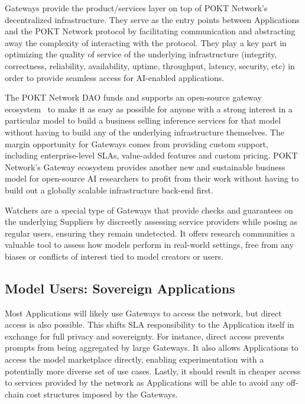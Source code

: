 \documentclass[conference,compsoc]{IEEEtran}
\begin{document}
Gateways provide the product/services layer on top of POKT Network’s decentralized infrastructure. They serve as the entry points between Applications and the POKT Network protocol by facilitating communication and abstracting away the complexity of interacting with the protocol. They play a key part in optimizing the quality of service of the underlying infrastructure (integrity, correctness, reliability, availability, uptime, throughput, latency, security, etc) in order to provide seamless access for AI-enabled applications.

The POKT Network DAO funds and supports an open-source gateway ecosystem~\cite{poktGatewayServer} to make it as easy as possible for anyone with a strong interest in a particular model to build a business selling inference services for that model without having to build any of the underlying infrastructure themselves. The margin opportunity for Gateways comes from providing custom support, including enterprise-level SLAs, value-added features and custom pricing. POKT Network’s Gateway ecosystem provides another new and sustainable business model for open-source AI researchers to profit from their work without having to build out a globally scalable infrastructure back-end first.

Watchers are a special type of Gateways that provide checks and guarantees on the underlying Suppliers by discreetly assessing service providers while posing as regular users, ensuring they remain undetected. It offers research communities a valuable tool to assess how models perform in real-world settings, free from any biases or conflicts of interest tied to model creators or users.


\subsection{Model Users: Sovereign Applications}

Most Applications will likely use Gateways to access the network, but direct access is also possible. This shifts SLA responsibility to the Application itself in exchange for full privacy and sovereignty. For instance, direct access prevents prompts from being aggregated by large Gateways. It also allows Applications to access the model marketplace directly, enabling experimentation with a potentially more diverse set of use cases. Lastly, it should result in cheaper access to services provided by the network as Applications will be able to avoid any off-chain cost structures imposed by the Gateways. 
\end{document}
